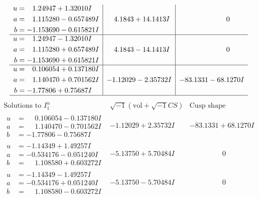 \documentclass[1p]{elsarticle_modified}
\theoremstyle{definition}
\newcommand{\I}{\sqrt{-1}}
\begin{document}
$$\begin{array}{c|c|c}
\begin{aligned}
u &= \phantom{-}1.24947 + 1.32010 I \\
a &= \phantom{-}1.115280 - 0.657489 I \\
b &= -1.153690 - 0.615821 I\end{aligned}
 & \phantom{-}4.1843 + 14.1413 I & \phantom{-0.000000 } 0 \\ \hline\begin{aligned}
u &= \phantom{-}1.24947 - 1.32010 I \\
a &= \phantom{-}1.115280 + 0.657489 I \\
b &= -1.153690 + 0.615821 I\end{aligned}
 & \phantom{-}4.1843 - 14.1413 I & \phantom{-0.000000 } 0 \\ \hline\begin{aligned}
u &= \phantom{-}0.106054 + 0.137180 I \\
a &= \phantom{-}1.140470 + 0.701562 I \\
b &= -1.77806 + 0.75687 I\end{aligned}
 & -1.12029 - 2.35732 I & -83.1331 - 68.1270 I\\
 \hline 
 \end{array}$$\newpage$$\begin{array}{c|c|c}  
\text{Solutions to }I^u_{1}& \I (\text{vol} + \sqrt{-1}CS) & \text{Cusp shape}\\
 \hline 
\begin{aligned}
u &= \phantom{-}0.106054 - 0.137180 I \\
a &= \phantom{-}1.140470 - 0.701562 I \\
b &= -1.77806 - 0.75687 I\end{aligned}
 & -1.12029 + 2.35732 I & -83.1331 + 68.1270 I \\ \hline\begin{aligned}
u &= -1.14349 + 1.49257 I \\
a &= -0.534176 - 0.051240 I \\
b &= \phantom{-}1.108580 + 0.603272 I\end{aligned}
 & -5.13750 + 5.70484 I & \phantom{-0.000000 } 0 \\ \hline\begin{aligned}
u &= -1.14349 - 1.49257 I \\
a &= -0.534176 + 0.051240 I \\
b &= \phantom{-}1.108580 - 0.603272 I\end{aligned}
 & -5.13750 - 5.70484 I & \phantom{-0.000000 } 0 \\ \hline\begin{aligned}

\end{aligned}
\end{array}$$
\end{document}
